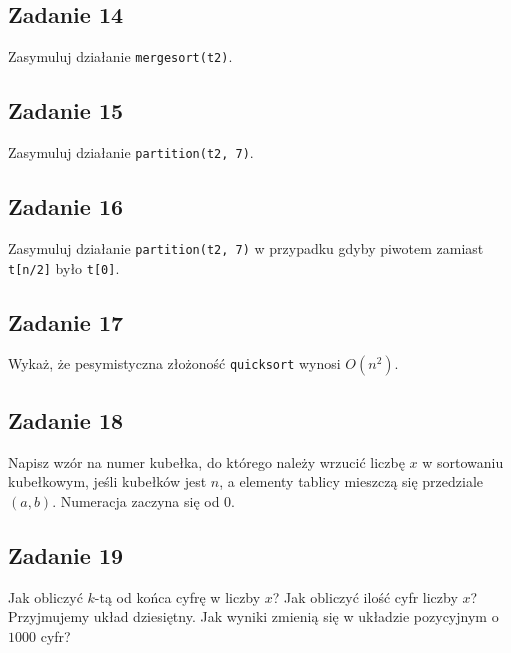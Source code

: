 \documentclass{article}
\begin{document}
\subsection*{Zadanie 14}
Zasymuluj działanie \verb+mergesort(t2)+.

\subsection*{Zadanie 15}
Zasymuluj działanie \verb+partition(t2, 7)+.

\subsection*{Zadanie 16}
Zasymuluj działanie \verb+partition(t2, 7)+ w przypadku gdyby piwotem zamiast \verb+t[n/2]+ było \verb+t[0]+.

\subsection*{Zadanie 17}
Wykaż, że pesymistyczna złożoność \verb+quicksort+ wynosi $O(n^2)$.

\subsection*{Zadanie 18}
Napisz wzór na numer kubełka, do którego należy wrzucić liczbę $x$ w sortowaniu
kubełkowym, jeśli kubełków jest $n$, a elementy tablicy mieszczą się przedziale $(a, b)$.
Numeracja zaczyna się od $0$.

\subsection*{Zadanie 19}
Jak obliczyć $k$-tą od końca cyfrę w liczby $x$? Jak obliczyć ilość cyfr liczby $x$?
Przyjmujemy układ dziesiętny. Jak wyniki zmienią się w układzie pozycyjnym o $1000$ cyfr?
\end{document}
